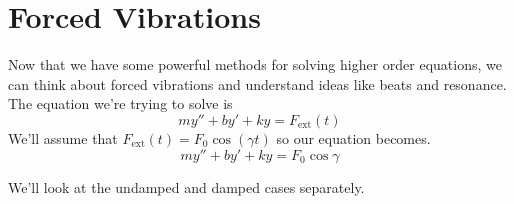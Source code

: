 \section{Forced Vibrations}
\noindent
Now that we have some powerful methods for solving higher order equations, we can think about forced vibrations and understand ideas like beats and resonance.\\

\noindent
The equation we're trying to solve is
\begin{equation*}
	my'' + by' + ky = F_{\text{ext}}(t)
\end{equation*}
We'll assume that $F_{\text{ext}}(t) = F_0\cos{(\gamma t)}$ so our equation becomes.
\begin{equation*}
	my'' + by' + ky = F_0\cos{\gamma}
\end{equation*}

\noindent
We'll look at the undamped and damped cases separately.


